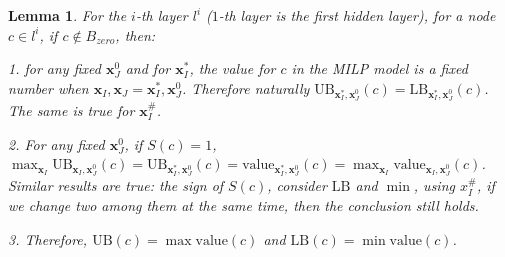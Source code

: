 \documentclass[]{article}
\newtheorem{lemma}{Lemma}
\theoremstyle{definition}
\newcommand{\Val}{\mathrm{value}}
\newcommand{\UB}{\mathrm{UB}}
\newcommand{\LB}{\mathrm{LB}}
\begin{document}
			
			\begin{lemma}
				For the $i$-th layer $l^i$ ($1$-th layer is the first hidden layer), for a node $c\in l^i$, if $c\notin B_{zero}$, then:
				
				\vspace*{1ex}
				
				1. for any fixed $\boldsymbol{x}^0_J$ and for $\boldsymbol{x}^*_I$, the value for $c$ in the MILP model is a fixed number when $\boldsymbol{x}_I,\boldsymbol{x}_J=\boldsymbol{x}^*_I,\boldsymbol{x}^0_J$. Therefore naturally $\UB_{\boldsymbol{x}^*_I,\boldsymbol{x}^0_J}(c)=\LB_{\boldsymbol{x}^*_I,\boldsymbol{x}^0_J}(c)$. The same is true for $\boldsymbol{x}^\#_I$.
				
				\vspace*{1ex}
				
				2. For any fixed $\boldsymbol{x}^0_J$, if $S(c)=1$,  $\max_{\boldsymbol{x}_I} \UB_{\boldsymbol{x}_I,\boldsymbol{x}^0_J}(c)=\UB_{\boldsymbol{x}^*_I,\boldsymbol{x}^0_J}(c)= \Val_{\boldsymbol{x}^*_I,\boldsymbol{x}^0_J}(c) = \max_{\boldsymbol{x}_I} \Val_{\boldsymbol{x}_I,\boldsymbol{x}^0_J}(c)$. Similar results are true: the sign of $S(c)$, consider $\LB$ and $\min$, using $x_I^\#$, if we change two among them at the same time, then the conclusion still holds.
				
				\vspace*{1ex}
				
				3. Therefore, $\UB(c)=\max\Val(c)$ and $\LB(c)=\min\Val(c)$.
				
				
			\end{lemma}
			
\end{document}
